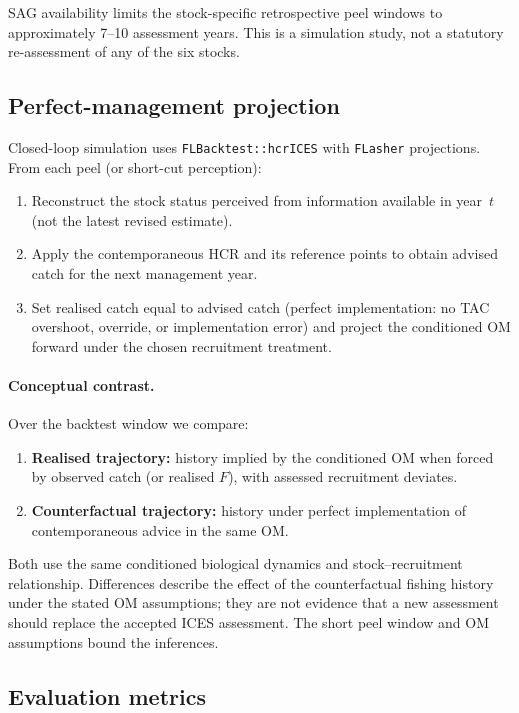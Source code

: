 \documentclass[11pt,a4paper]{extarticle}
\begin{document}
SAG availability limits the stock-specific retrospective peel windows to
approximately 7--10 assessment years. This is a simulation study, not a
statutory re-assessment of any of the six stocks.

\subsection{Perfect-management projection}

Closed-loop simulation uses \texttt{FLBacktest::hcrICES} with
\texttt{FLasher} projections. From each peel (or short-cut perception):
\begin{enumerate}
  \item Reconstruct the stock status perceived from information available in
        year~\(t\) (not the latest revised estimate).
  \item Apply the contemporaneous HCR and its reference points to obtain
        advised catch for the next management year.
  \item Set realised catch equal to advised catch (perfect implementation: no
        TAC overshoot, override, or implementation error) and project the
        conditioned OM forward under the chosen recruitment treatment.
\end{enumerate}

\paragraph{Conceptual contrast.}
Over the backtest window we compare:
\begin{enumerate}
  \item \textbf{Realised trajectory:} history implied by the conditioned OM
        when forced by observed catch (or realised \(F\)), with assessed
        recruitment deviates.
  \item \textbf{Counterfactual trajectory:} history under perfect
        implementation of contemporaneous advice in the same OM.
\end{enumerate}
Both use the same conditioned biological dynamics and stock--recruitment
relationship. Differences describe the effect of the counterfactual fishing
history under the stated OM assumptions; they are not evidence that a new
assessment should replace the accepted ICES assessment. The short peel window
and OM assumptions bound the inferences.

\subsection{Evaluation metrics}
\end{document}
